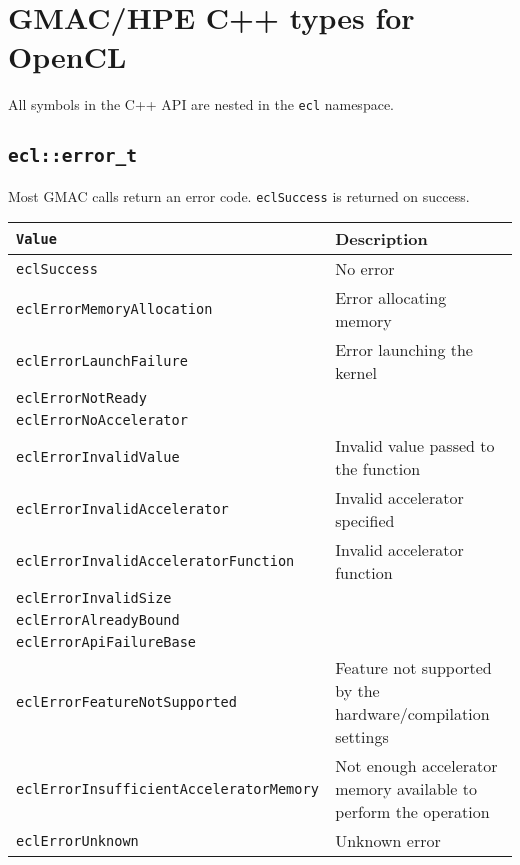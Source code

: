 \section{GMAC\slash HPE C++ types for OpenCL}

All symbols in the C++ API are nested in the \texttt{ecl} namespace.

\subsection{\texttt{ecl::error\_t}}

Most GMAC calls return an error code. \texttt{eclSuccess} is returned on success.
\vspace{11pt}\\
\begin{tabularx}{\linewidth}{|>{\texttt\bgroup}l<{\egroup}|X|}
  \hline
  \textnormal{Value} & Description \\
  \hline
  \hline
  eclSuccess                            & No error                             \\
  eclErrorMemoryAllocation              & Error allocating memory              \\
  eclErrorLaunchFailure                 & Error launching the kernel           \\
  eclErrorNotReady                      &                                      \\
  eclErrorNoAccelerator                 &                                      \\
  eclErrorInvalidValue                  & Invalid value passed to the function \\
  eclErrorInvalidAccelerator            & Invalid accelerator specified        \\
  eclErrorInvalidAcceleratorFunction    & Invalid accelerator function         \\
  eclErrorInvalidSize                   &                                      \\
  eclErrorAlreadyBound                  &                                      \\
  eclErrorApiFailureBase                &                                      \\
  eclErrorFeatureNotSupported           & Feature not supported by the hardware\slash{}compilation
                                          settings                             \\
  eclErrorInsufficientAcceleratorMemory & Not enough accelerator memory available to perform the 
                                          operation                            \\
  eclErrorUnknown                       & Unknown error                        \\
  \hline
\end{tabularx}

